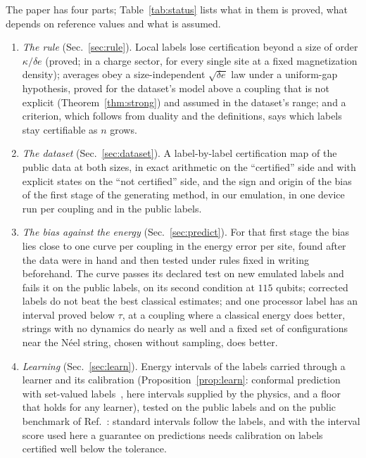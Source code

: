 \documentclass[aps,prx,twocolumn,10pt,superscriptaddress,nofootinbib,longbibliography,floatfix]{revtex4-2}
\theoremstyle{remark}
\newcommand{\de}{\delta e}
\begin{document}
The paper has four parts; Table~\ref{tab:status} lists what in them is proved, what depends on reference values
and what is assumed.
\begin{enumerate}
\item \emph{The rule} (Sec.~\ref{sec:rule}). Local labels lose certification beyond a size of order $\kappa/\de$
(proved; in a charge sector, for every single site at a fixed magnetization density); averages obey a
size-independent $\sqrt{\de}$ law under a uniform-gap hypothesis, proved for the dataset's model above a coupling
that is not explicit (Theorem~\ref{thm:strong}) and assumed in the dataset's range; and a criterion, which follows
from duality and the definitions, says which labels stay certifiable as $n$ grows.
\item \emph{The dataset} (Sec.~\ref{sec:dataset}). A label-by-label certification map of the public data at both
sizes, in exact arithmetic on the ``certified'' side and with explicit states on the ``not certified'' side, and
the sign and origin of the bias of the first stage of the generating method, in our emulation, in one device run
per coupling and in the public labels.
\item \emph{The bias against the energy} (Sec.~\ref{sec:predict}). For that first stage the bias lies close to one
curve per coupling in the energy error per site, found after the data were in hand and then tested under rules
fixed in writing beforehand. The curve passes its declared test on new emulated labels and fails it on the
public labels, on its second condition at $115$ qubits; corrected labels do not beat the best classical %
estimates; and one processor label has an
interval proved below $\tau$, at a coupling where a classical energy does better, strings with no dynamics do nearly
as well and a fixed set of configurations near the N\'eel string, chosen without sampling, does better.
\item \emph{Learning} (Sec.~\ref{sec:learn}). Energy intervals of the labels carried through a learner and its
calibration (Proposition~\ref{prop:learn}: conformal prediction with set-valued
labels~\cite{javanmardi2023,cauchois2022}, here intervals supplied by the physics, and a floor that holds for any
learner), tested on the public labels and on the public benchmark of Ref.~\cite{huang2022}: standard intervals
follow the labels, and with the interval score used here a guarantee on predictions needs calibration on labels
certified well below the tolerance.
\end{enumerate}
\end{document}
